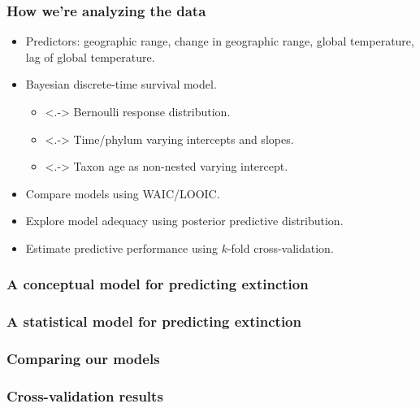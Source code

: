 \documentclass{beamer}
\begin{document}
\begin{frame}
  \frametitle{How we're analyzing the data}

  \begin{itemize}[<+->]
    \item Predictors: geographic range, change in geographic range, global temperature, lag of global temperature.
    \item Bayesian discrete-time survival model.
      \begin{itemize}
        \item<.-> Bernoulli response distribution.
        \item<.-> Time/phylum varying intercepts and slopes.
        \item<.-> Taxon age as non-nested varying intercept.
      \end{itemize}
    \item \alert{Compare} models using WAIC/LOOIC.
    \item Explore model \alert{adequacy} using posterior predictive distribution.
    \item Estimate \alert{predictive performance} using \(k\)-fold cross-validation.
  \end{itemize}

\end{frame}


\begin{frame}
  \frametitle{A conceptual model for predicting extinction}

\end{frame}


\begin{frame}
  \frametitle{A statistical model for predicting extinction}

\end{frame}


\begin{frame}
  \frametitle{Comparing our models}


\end{frame}


\begin{frame}
  \frametitle{Cross-validation results}


\end{frame}
\end{document}
